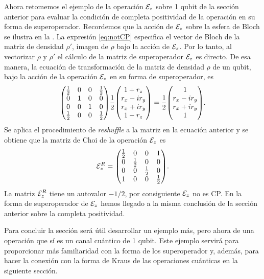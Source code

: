 Ahora retomemos el ejemplo de la operación $\mathcal{E}_z$ 
sobre 1 qubit de la sección anterior para evaluar la condición de 
completa positividad de la operación en su forma de superoperador. 
Recordemos que la acción de $\mathcal{E}_z$ sobre la 
esfera de Bloch se ilustra en la .
La expresión \eqref{eq:notCP} especifica el vector de Bloch
de la matriz de densidad $\rho'$, imagen de $\rho$ bajo la acción de $\mathcal{E}_z$.
Por lo tanto, al vectorizar $\rho$ y $\rho'$ el cálculo 
de la matriz de superoperador $\mathcal{E}_z$ es directo. 
De esa manera, la ecuación de transformación 
de la matriz de densidad $\rho$ de un qubit, bajo la
acción de la operación $\mathcal{E}_z$ en su forma de superoperador, es
\begin{align}
\mqty(
\frac{1}{2} & 0 & 0 & \frac{1}{2} \\
0 & 1 & 0 & 0 \\
0 & 0 & 1 & 0 \\
\frac{1}{2} & 0 & 0 & \frac{1}{2} \\
)
\frac{1}{2}
\mqty(
1+r_z\\r_x-ir_y\\r_x+ir_y\\1-r_z
)
=
\frac{1}{2}
\mqty(
1\\r_x-ir_y\\r_x+ir_y\\1
).
\end{align}
Se aplica el procedimiento de \textit{reshuffle} a la matriz en la ecuación 
anterior y se obtiene que la matriz de Choi de la operación $\mathcal{E}_z$ es
\begin{align}
\E_z^R=
\mqty(
\frac{1}{2} & 0 & 0 & 1 \\
0 & \frac{1}{2} & 0 & 0 \\
0 & 0 & \frac{1}{2} & 0 \\
1 & 0 & 0 & \frac{1}{2} 
).
\end{align}
La matriz $\mathcal{E}_z^R$ tiene un autovalor $-1/2$, 
por consiguiente $\mathcal{E}_z$ no es CP. 
En la forma de superoperador de $\mathcal{E}_z$ hemos llegado a la misma
conclusión de la sección anterior sobre la 
completa positividad.


Para concluir la sección será útil desarrollar un ejemplo más, 
pero ahora de una operación que sí es un canal cuántico de 1 qubit. Este 
ejemplo servirá para proporcionar más familiaridad con la forma de 
los superoperador y, además, para hacer la conexión con 
la forma de Kraus de las operaciones cuánticas en la siguiente sección.

